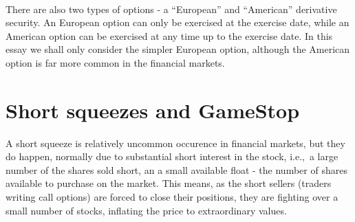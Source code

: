 \documentclass[11pt]{article} %
\begin{document}
\paragraph{}\label{typesofoption}
There are also two types of options - a ``European'' and ``American'' 
derivative security. An European option can only be exercised at the 
exercise date, while an American option can be exercised at any time up 
to the exercise date. In this essay we shall only consider the simpler 
European option, although the American option is far more common in 
the financial markets. 

\section{Short squeezes and GameStop}
A short squeeze is relatively uncommon occurence in financial markets, but they do 
happen, normally due to substantial short interest in the stock, i.e.,\  a large number 
of the shares sold short, an a small available float - the number of shares 
available to purchase on the market. This means, as the short sellers (traders 
writing call options) are forced to close their positions, they are fighting over 
a small number of stocks, inflating the price to extraordinary values. 
\end{document}
